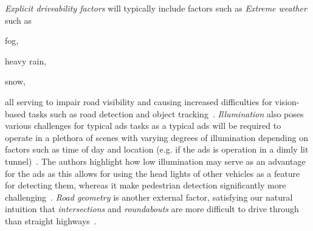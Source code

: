 \emph{Explicit driveability factors} will typically include factors such as \emph{Extreme
    weather} such as \begin{inparaenum}
    \item fog,
    \item heavy rain,
    \item snow,
\end{inparaenum}
all serving to impair road visibility and causing increased difficulties for vision-based tasks such
as road detection and object tracking~\cite[3136-3137]{safeToDrive}. \emph{Illumination} also
poses various challenges for typical \acrshort{ads} tasks as a typical \acrshort{ads} will be
required to operate in a plethora of scenes with varying degrees of illumination depending on
factors such as time of day and location (e.g. if the \acrshort{ads} is operation in a dimly lit
tunnel)~\cite[3137]{safeToDrive}. The authors highlight how low illumination may serve as an
advantage for the \acrshort{ads} as this allows for using the head lights of other vehicles as a
feature for detecting them, whereas it make pedestrian detection significantly more
challenging~\cite[3137]{safeToDrive}. \emph{Road geometry} is another external factor, satisfying
our natural intuition that \textit{intersections} and \textit{roundabouts} are more difficult to
drive through than straight highways~\cite[3137]{safeToDrive}.

